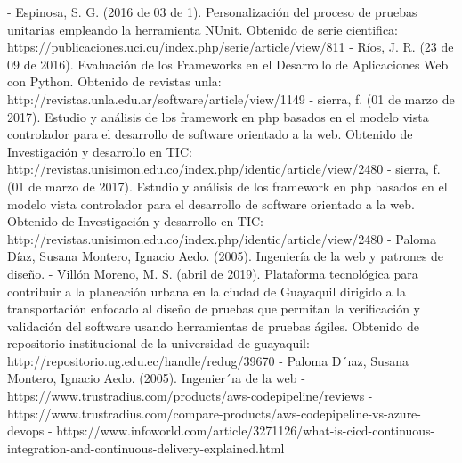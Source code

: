 \documentclass[12pt,letterpaper]{article}
\begin{document}
\begin{thebibliography}{XXX0000}

\bibitem - Espinosa, S. G. (2016 de 03 de 1). Personalización del proceso de pruebas unitarias empleando la herramienta NUnit. Obtenido de serie cientifica: https://publicaciones.uci.cu/index.php/serie/article/view/811
\bibitem - Ríos, J. R. (23 de 09 de 2016). Evaluación de los Frameworks en el Desarrollo de Aplicaciones Web con Python. Obtenido de revistas unla: http://revistas.unla.edu.ar/software/article/view/1149
\bibitem - sierra, f. (01 de marzo de 2017). Estudio y análisis de los framework en php basados en el modelo vista controlador para el desarrollo de software orientado a la web. Obtenido de Investigación y desarrollo en TIC: http://revistas.unisimon.edu.co/index.php/identic/article/view/2480
\bibitem - sierra, f. (01 de marzo de 2017). Estudio y análisis de los framework en php basados en el modelo vista controlador para el desarrollo de software orientado a la web. Obtenido de Investigación y desarrollo en TIC: http://revistas.unisimon.edu.co/index.php/identic/article/view/2480 
\bibitem - Paloma Díaz, Susana Montero, Ignacio Aedo. (2005). Ingeniería de la web y patrones de diseño.
\bibitem - Villón Moreno, M. S. (abril de 2019). Plataforma tecnológica para contribuir a la planeación urbana en la ciudad de Guayaquil dirigido a la transportación enfocado al diseño de pruebas que permitan la verificación y validación del software usando herramientas de pruebas ágiles. Obtenido de repositorio institucional de la universidad de guayaquil: http://repositorio.ug.edu.ec/handle/redug/39670
\bibitem - Paloma D´ıaz, Susana Montero, Ignacio Aedo. (2005). Ingenier´ıa de la web
\bibitem - https://www.trustradius.com/products/aws-codepipeline/reviews
\bibitem - https://www.trustradius.com/compare-products/aws-codepipeline-vs-azure-devops
\bibitem - https://www.infoworld.com/article/3271126/what-is-cicd-continuous-integration-and-continuous-delivery-explained.html

\end{thebibliography}
\end{document}
